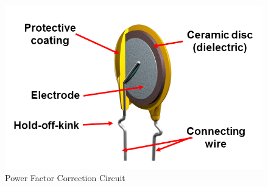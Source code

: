 \begin{figure}[ht!]
\includegraphics[keepaspectratio=true,scale=.5]{./figures/parameters/powerFactor.png}
\centering
\caption{Power Factor Correction Circuit}
\label{powerFactor}
\end{figure}
